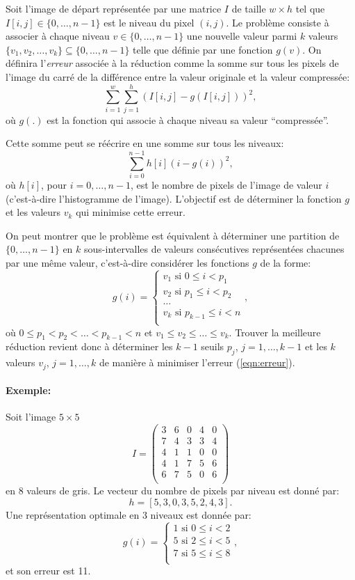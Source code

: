 \documentclass[a4paper,10pt]{article}
\begin{document}
Soit l'image de départ représentée par une matrice $I$ de taille
$w\times h$ tel que $I[i,j]\in\{0,\ldots,n-1\}$ est le niveau du pixel
$(i,j)$. Le problème consiste à associer à chaque niveau $v\in
\{0,\ldots,n-1\}$ une nouvelle valeur parmi $k$ valeurs $\{v_1,
v_2,\ldots, v_k\} \subseteq \{0,\ldots, n-1\}$ telle que définie par une
fonction $g(v)$. On définira l'{\it erreur} associée à la réduction
comme la somme sur tous les pixels de l'image du carré de la
différence entre la valeur originale et la valeur compressée:
$$\sum_{i=1}^w\sum_{j=1}^h (I[i,j]-g(I[i,j]))^2,$$ où $g(.)$ est la
fonction qui associe à chaque niveau sa valeur ``compressée''.

Cette somme peut se réécrire en une somme sur tous les niveaux:
\begin{equation}\label{eqn:erreur}
\sum_{i=0}^{n-1} h[i] (i-g(i))^2,
\end{equation}
où $h[i]$, pour $i=0,\ldots,n-1$, est le nombre de pixels de l'image
de valeur $i$ (c'est-à-dire l'histogramme de l'image). L'objectif est
de déterminer la fonction $g$ et les valeurs $v_k$ qui minimise cette
erreur.

On peut montrer que le problème est équivalent à déterminer une
partition de $\{0,\ldots,n-1\}$ en $k$ sous-intervalles de valeurs
consécutives représentées chacunes par une même valeur, c'est-à-dire
considérer les fonctions $g$ de la forme:
\[
g(i)=\left\{
\begin{array}{ll}
v_1\mbox{ si }0\leq i<p_1\\
v_2\mbox{ si }p_1\leq i < p_2\\
\ldots\\
v_k\mbox{ si }p_{k-1}\leq i< n\\
\end{array}
\right.,
\]
où $0\leq p_1<p_2<\ldots<p_{k-1}<n$ et $v_1\leq v_2\leq\ldots \leq v_k$. Trouver la meilleure réduction revient
donc à déterminer les $k-1$ seuils $p_j$, $j=1,\ldots, k-1$ et les $k$
valeurs $v_j$, $j=1,\ldots,k$ de manière à minimiser l'erreur
(\ref{eqn:erreur}).


\paragraph{Exemple:} Soit l'image $5\times 5$
$$I=\left(\begin{matrix}
     3 & 6 & 0 & 4 & 0\\
     7 & 4 & 3 & 3 & 4\\
     4 & 1 & 1 & 0 & 0\\
     4 & 1 & 7 & 5 & 6\\
     6 & 7 & 5 & 0 & 6\\
\end{matrix}\right)
$$
en 8 valeurs de gris. Le vecteur du nombre de pixels par niveau est donné par:
$$h=[5,3,0,3,5,2,4,3].$$ Une représentation optimale en 3 niveaux est donnée par:
\[g(i)=\left\{
\begin{array}{ll}
1\mbox{ si }0\leq i<2\\
5\mbox{ si }2\leq i < 5\\
7\mbox{ si }5\leq i\leq 8\\
\end{array}
\right.,
\]
et son erreur est 11.
\end{document}
